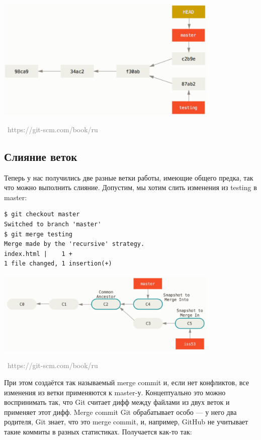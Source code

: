 \documentclass[a5paper]{article}
\newcommand{\attribution}[1] {
\vspace{-5mm}\begin{flushright}\begin{scriptsize}\textcolor{gray}{\textcopyright\, #1}\end{scriptsize}\end{flushright}
}
\begin{document}
\begin{center}
	\includegraphics[width=0.8\textwidth]{newCommitToMaster.png}
	\attribution{https://git-scm.com/book/ru}
\end{center}

\subsection{Слияние веток}

Теперь у нас получились две разные ветки работы, имеющие общего предка, так что можно выполнить слияние. Допустим, мы хотим слить изменения из testing в master:

\begin{verbatim}
$ git checkout master
Switched to branch 'master'
$ git merge testing
Merge made by the 'recursive' strategy.
index.html |    1 +
1 file changed, 1 insertion(+)
\end{verbatim}

\begin{center}
	\includegraphics[width=0.8\textwidth]{merge.png}
	\attribution{https://git-scm.com/book/ru}
\end{center}

При этом создаётся так называемый merge commit и, если нет конфликтов, все изменения из ветки применяются к master-у. Концептуально это можно воспринимать так, что Git считает дифф между файлами из двух веток и применяет этот дифф. Merge commit Git обрабатывает особо --- у него два родителя, Git знает, что это merge commit, и, например, GitHub не учитывает такие коммиты в разных статистиках. Получается как-то так:
\end{document}
